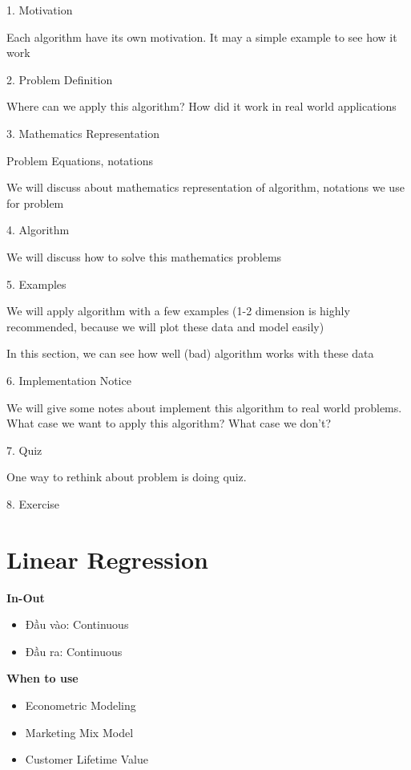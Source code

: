 1. Motivation

Each algorithm have its own motivation. It may a simple example to see how it work

2. Problem Definition

Where can we apply this algorithm? How did it work in real world applications

3. Mathematics Representation

Problem Equations, notations

We will discuss about mathematics representation of algorithm, notations we use for problem

4. Algorithm

We will discuss how to solve this mathematics problems

5. Examples

We will apply algorithm with a few examples (1-2 dimension is highly recommended, because we will plot these data and model easily)

In this section, we can see how well (bad) algorithm works with these data

6. Implementation Notice

We will give some notes about implement this algorithm to real world problems. What case we want to apply this algorithm? What case we don't?

7. Quiz

One way to rethink about problem is doing quiz.

8. Exercise


\section{Linear Regression}


\noindent\textbf{In-Out}

\begin{itemize}
  \item Đầu vào: Continuous
  \item Đầu ra: Continuous
\end{itemize}

\noindent \textbf{When to use}

\begin{itemize}
  \item Econometric Modeling
  \item Marketing Mix Model
  \item Customer Lifetime Value
\end{itemize}

